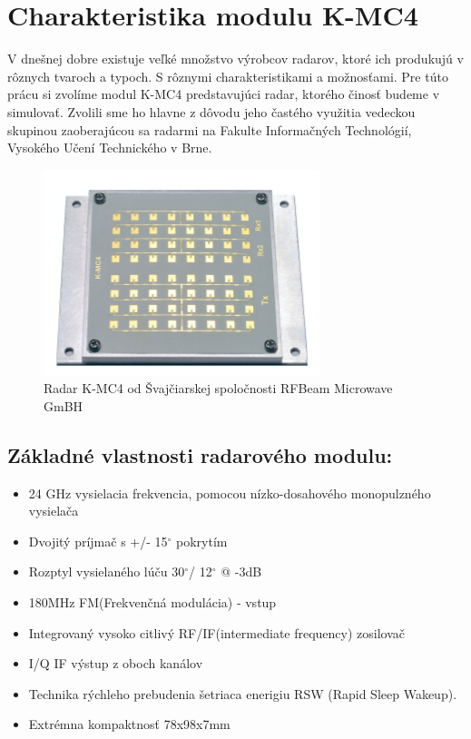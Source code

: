   \section{Charakteristika modulu K-MC4}

    V dnešnej dobre existuje veľké množstvo výrobcov radarov, ktoré ich produkujú v rôznych tvaroch a typoch. S rôznymi charakteristikami a možnosťami. Pre túto prácu si zvolíme modul K-MC4 predstavujúci radar, ktorého činosť budeme v simulovať. Zvolili sme ho hlavne z dôvodu jeho častého využitia vedeckou skupinou zaoberajúcou sa radarmi na Fakulte Informačných Technológií, Vysokého Učení Technického v Brne.

    \begin{figure}[h!]
        \centering
        \includegraphics[width=.4\textwidth]{obrazky-figures/kmc4fyz.png}
        \caption{Radar K-MC4 od Švajčiarskej spoločnosti RFBeam Microwave GmBH \cite{kmc4sheet}}
        \label{fig:kmc4fyz}
    \end{figure}

    \subsection{Základné vlastnosti radarového modulu\cite{kmc4sheet}:}
    \begin{itemize}
      \item 24 GHz vysielacia frekvencia, pomocou nízko-dosahového monopulzného vysielača
      \item Dvojitý príjmač s +/- 15$^{\circ}$ pokrytím
      \item Rozptyl vysielaného lúču 30$^{\circ}$/ 12$^{\circ}$ @ -3dB
      \item 180MHz FM(Frekvenčná modulácia) - vstup
      \item Integrovaný vysoko citlivý RF/IF(intermediate
frequency) zosilovač
      \item I/Q IF výstup z oboch kanálov
      \item Technika rýchleho prebudenia šetriaca enerigiu RSW (Rapid Sleep Wakeup).
      \item Extrémna kompaktnosť 78x98x7mm
    \end{itemize}


